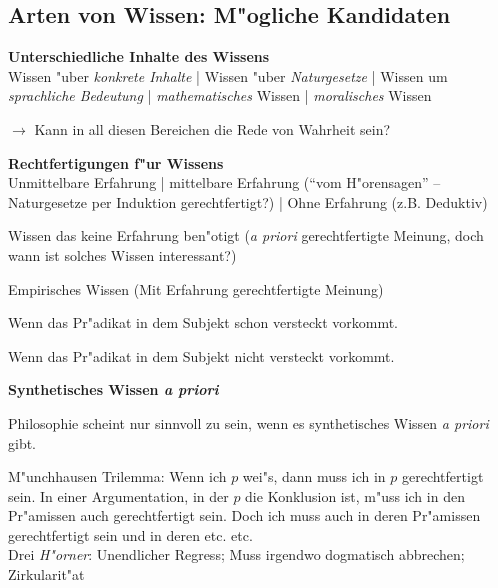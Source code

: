 \documentclass[emulatestandardclasses]{scrartcl}
\begin{document}
\subsection{Arten von Wissen: M"ogliche Kandidaten}
\textbf{Unterschiedliche Inhalte des Wissens}\\
Wissen "uber \emph{konkrete Inhalte} | Wissen "uber \emph{Naturgesetze} | Wissen um \emph{sprachliche Bedeutung} | \emph{mathematisches} Wissen | \emph{moralisches} Wissen

\hspace{3mm}$\rightarrow$ Kann in all diesen Bereichen die Rede von Wahrheit sein?
\newline

\noindent\textbf{Rechtfertigungen f"ur Wissens}\\
Unmittelbare Erfahrung | mittelbare Erfahrung ("`vom H"orensagen"' -- Naturgesetze per Induktion gerechtfertigt?) | Ohne Erfahrung (z.B. Deduktiv)

\begin{description}[leftmargin=!,labelwidth=\widthof{\bfseries A posteriorisches Wissen}]
  \item[A priorisches Wissen] Wissen das keine Erfahrung ben"otigt (\emph{a priori} gerechtfertigte Meinung, doch wann ist solches Wissen interessant?)
  \item[A posteriorisches Wissen] Empirisches Wissen (Mit Erfahrung gerechtfertigte Meinung)
  \item[Analytisches Urteil] Wenn das Pr"adikat in dem Subjekt schon versteckt vorkommt.
  \item[Synthetisches Urteil] Wenn das Pr"adikat in dem Subjekt nicht versteckt vorkommt.
\end{description}
\noindent\textbf{Synthetisches Wissen \emph{a priori}}\\

\begin{center}
Philosophie scheint nur sinnvoll zu sein, wenn es synthetisches Wissen \emph{a priori} gibt.
\end{center}

M"unchhausen Trilemma: Wenn ich $p$ wei"s, dann muss ich in $p$ gerechtfertigt sein. In einer Argumentation, in der $p$ die Konklusion ist, m"uss ich in den Pr"amissen auch gerechtfertigt sein. Doch ich muss auch in deren Pr"amissen gerechtfertigt sein und in deren etc. etc.\\
Drei \emph{H"orner}: Unendlicher Regress; Muss irgendwo dogmatisch abbrechen; Zirkularit"at
\end{document}
